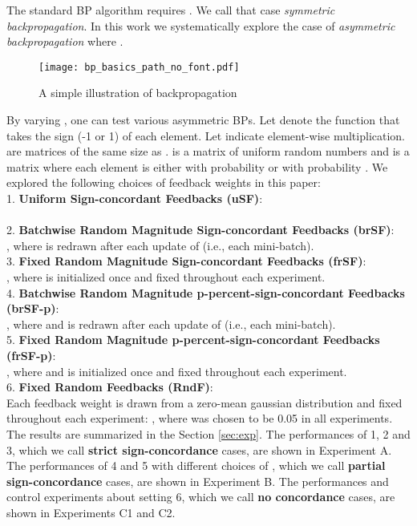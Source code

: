 \documentclass[letterpaper]{article}
\begin{document}
The standard BP algorithm requires .  We call that case \emph{symmetric backpropagation}. In this work we systematically explore the case of \emph{asymmetric backpropagation} where .

\begin{figure}[h]
\centering
 \texttt{[image: bp\_basics\_path\_no\_font.pdf]}
  \caption{A simple illustration of backpropagation}
\label{fig:bp_basics}
\end{figure}

By varying , one can test various asymmetric BPs.  Let  denote the function that takes the sign (-1 or 1) of each element. Let  indicate element-wise multiplication.  are matrices of the same size as .  is a matrix of uniform random numbers  and  is a matrix where each element is either  with probability  or  with probability . We explored the following choices of feedback weights  in this paper: \\
1. \textbf{Uniform Sign-concordant Feedbacks (uSF)}:\\  \\
2. \textbf{Batchwise Random Magnitude Sign-concordant Feedbacks (brSF)}:\\ , where  is redrawn after each update of  (i.e., each mini-batch). \\
3. \textbf{Fixed Random Magnitude Sign-concordant Feedbacks (frSF)}:\\ , where  is initialized once and fixed throughout each experiment.  \\
4. \textbf{Batchwise Random Magnitude p-percent-sign-concordant Feedbacks (brSF-p)}:\\ , where  and  is redrawn after each update of   (i.e., each mini-batch). \\
5. \textbf{Fixed Random Magnitude  p-percent-sign-concordant Feedbacks (frSF-p)}:\\ , where  and  is initialized once and fixed throughout each experiment.  \\
6. \textbf{Fixed Random Feedbacks (RndF)}:\\  Each feedback weight is drawn from a zero-mean gaussian distribution and fixed throughout each experiment: , where  was chosen to be 0.05 in all experiments. \\

The results are summarized in the Section \ref{sec:exp}. The performances of 1, 2 and 3, which we call \textbf{strict sign-concordance} cases, are shown in Experiment A. The performances of 4 and 5 with different choices of , which we call \textbf{partial sign-concordance} cases, are shown in Experiment B. The performances and control experiments about setting 6, which we call \textbf{no concordance} cases, are shown in Experiments C1 and C2.
\end{document}

